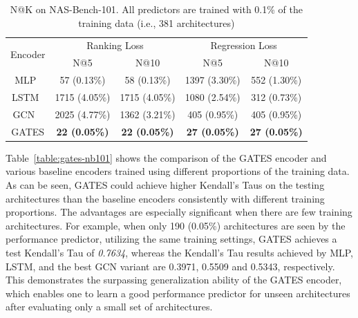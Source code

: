 \documentclass[runningheads]{llncs}
\begin{document}
\begin{table}[th]
    \caption{N@K on NAS-Bench-101. All predictors are trained with 0.1\% of the training data (i.e., 381 architectures)}
    \label{table:natk-nb101}
    \vspace{-5pt}
    \begin{center}
    \begin{tabular}{c@{\hskip 0.02\linewidth}cccc}
    \toprule
    \multirow{2}{*}{Encoder} & \multicolumn{2}{c}{Ranking Loss} &  \multicolumn{2}{c}{Regression Loss} \\ 
    \cmidrule(lr){2-3}\cmidrule(lr){4-5} & N@5 & N@10 & N@5 & N@10  \\ \midrule
    MLP~\cite{wang2018alphax}   &    57 (0.13\%)    &    58 (0.13\%)   &    1397 (3.30\%)   &   552 (1.30\%)    \\
    LSTM~\cite{wang2018alphax}     &      1715 (4.05\%)  &   1715 (4.05\%) &   1080 (2.54\%)   & 312 (0.73\%)  \\
    GCN ~\cite{shi2019multi} & 2025 (4.77\%) & 1362 (3.21\%) & 405 (0.95\%) & 405 (0.95\%) \\
    \hline
    GATES & {\bf 22 (0.05\%)} & {\bf 22 (0.05\%)} & {\bf 27 (0.05\%)} & {\bf 27 (0.05\%)} \\\bottomrule
    \end{tabular}
  \end{center}
    \vspace{-15pt}
\end{table}




Table~\ref{table:gates-nb101} shows the comparison of the GATES encoder and various baseline encoders trained using different proportions of the training data. 
As can be seen, GATES could achieve higher Kendall's Taus on the testing architectures than the baseline encoders consistently with different training proportions. The advantages are especially significant when there are few training architectures. For example, when only 190 (0.05\%) architectures are seen by the performance predictor, utilizing the same training settings, GATES achieves a test Kendall's Tau of \textit{0.7634},
whereas the Kendall's Tau results achieved by MLP, LSTM, and the best GCN variant are 0.3971, 0.5509 and 0.5343, respectively. This demonstrates the surpassing generalization ability of the GATES encoder, which enables one to learn a good performance predictor for unseen architectures after evaluating only a small set of architectures.
\end{document}
